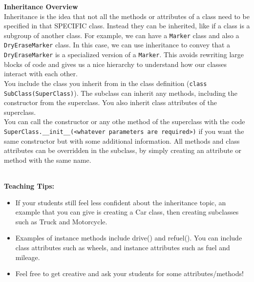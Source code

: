 \textbf{Inheritance Overview} \\
Inheritance is the idea that not all the methods or attributes of a class need to be specified in that SPECIFIC class. Instead they can be inherited, like if a class is a subgroup of another class.
For example, we can have a \lstinline{Marker} class and also a \lstinline{DryEraseMarker} class. In this case, we can use inheritance to convey that a \lstinline{DryEraseMarker} is a specialized version of a \lstinline{Marker}.
This avoids rewriting large blocks of code and gives us a nice hierarchy to understand how our classes interact with each other. \\

You include the class you inherit from in the class definition (\lstinline{class SubClass(SuperClass)}). The subclass can inherit any methods, including the constructor from the superclass. You also inherit class attributes of the superclass. \\
You can call the constructor or any othe method of the superclass with the code \lstinline{SuperClass.__init__(<whatever parameters are required>)} if you want the same constructor but with some additional information. All methods and class attributes can be overridden in the subclass, by simply creating an attribute or method with the same name. \\
\\
\begin{blocksection}
\begin{guide}
\textbf{Teaching Tips:}

\begin{itemize}
	\item If your students still feel less confident about the inheritance topic, an example that you can give is creating a Car class, then creating subclasses such as Truck and Motorcycle.
	\item Examples of instance methods include drive() and refuel(). You can include class attributes such as wheels, and instance attributes such as fuel and mileage.
	\item Feel free to get creative and ask your students for some attributes/methods!
\end{itemize}
\end{guide}
\end{blocksection}
